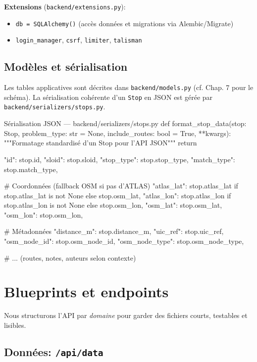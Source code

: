 \noindent
\textbf{Extensions} (\texttt{backend/extensions.py}):
\begin{itemize}
  \item \texttt{db = SQLAlchemy()} (accès données et migrations via Alembic/Migrate)
  \item \texttt{login\_manager}, \texttt{csrf}, \texttt{limiter}, \texttt{talisman}
\end{itemize}

\subsection*{Modèles et sérialisation}

Les tables applicatives sont décrites dans \texttt{backend/models.py} (cf. Chap. 7 pour le schéma). La sérialisation cohérente d'un \texttt{Stop} en JSON est gérée par \texttt{backend/serializers/stops.py}.

\begin{codebox}[language=Python]{Sérialisation JSON — backend/serializers/stops.py}
def format_stop_data(stop: Stop, 
                    problem_type: str = None, 
                    include_routes: bool = True, 
                    **kwargs):
    """Formatage standardisé d'un Stop pour l'API JSON"""
    return {
        "id": stop.id,
        "sloid": stop.sloid,
        "stop_type": stop.stop_type,
        "match_type": stop.match_type,
        
        # Coordonnées (fallback OSM si pas d'ATLAS)
        "atlas_lat": stop.atlas_lat if stop.atlas_lat is not None else stop.osm_lat,
        "atlas_lon": stop.atlas_lon if stop.atlas_lon is not None else stop.osm_lon,
        "osm_lat": stop.osm_lat, 
        "osm_lon": stop.osm_lon,
        
        # Métadonnées
        "distance_m": stop.distance_m, 
        "uic_ref": stop.uic_ref,
        "osm_node_id": stop.osm_node_id, 
        "osm_node_type": stop.osm_node_type,
        
        # ... (routes, notes, auteurs selon contexte)
    }
\end{codebox}

\section{Blueprints et endpoints}
Nous structurons l'API par \textit{domaine} pour garder des fichiers courts, testables et lisibles.

\subsection{Données: \texttt{/api/data}}

